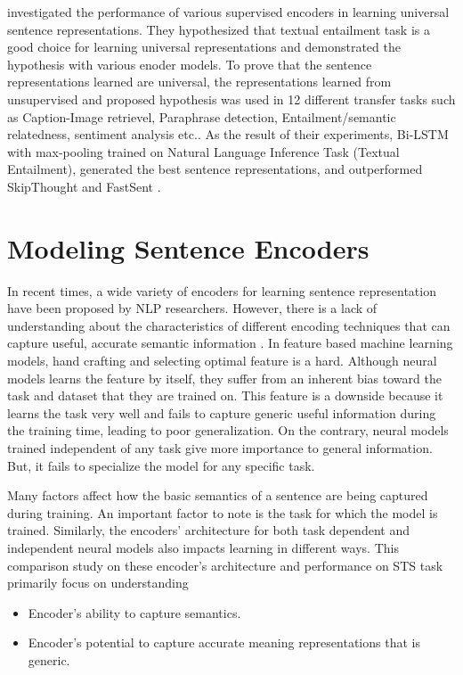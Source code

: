 \documentclass[12pt]{report} %
\begin{document}
\cite{conneau2017supervised} investigated the performance of various supervised encoders in learning universal sentence representations. They hypothesized that textual entailment task is a good choice for learning universal representations and demonstrated the hypothesis with various enoder models. To prove that the sentence representations learned are universal, the representations learned from unsupervised and proposed hypothesis was used in 12 different transfer tasks such as Caption-Image retrievel, Paraphrase detection, Entailment/semantic relatedness, sentiment analysis etc.. As the result of their experiments, Bi-LSTM with max-pooling trained on Natural Language Inference Task (Textual Entailment), generated the best sentence representations, and outperformed SkipThought \cite{kiros2015skip} and FastSent \cite{hill2016learning}.

\chapter{Modeling Sentence Encoders}

In recent times, a wide variety of encoders for learning sentence representation have been proposed by NLP researchers. However, there is a lack of understanding about the characteristics of different encoding techniques that can capture useful, accurate semantic information \citep{conneau2017supervised}. In feature based machine learning models, hand crafting and selecting optimal feature is a hard. Although neural models learns the feature by itself, they suffer from an inherent bias toward the task and dataset that they are trained on.
This feature is a downside because it learns the task very well and fails to capture generic useful information during the training time, leading to poor generalization. On the contrary, neural models trained independent of any task give more importance to general information. But, it fails to specialize the model for any specific task. 

Many factors affect how the basic semantics of a sentence are being captured during training. An important factor to note is the task for which the model is trained. Similarly, the encoders' architecture for both task dependent and independent neural models also impacts learning in different ways. This comparison study on these encoder's architecture and performance on STS task primarily focus on understanding 

\begin{itemize}
	\item Encoder's ability to capture semantics.
	\item Encoder's potential to capture accurate meaning representations that is generic.
\end{itemize}	
\end{document}
